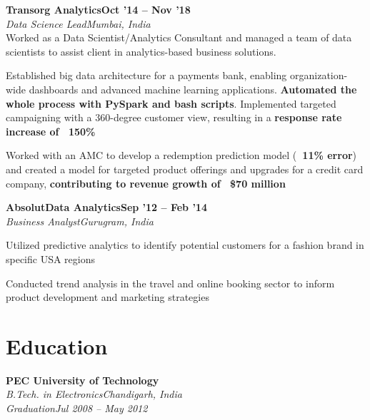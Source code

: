 \documentclass[letterpaper,10pt]{article}
\newcommand{\heading}[2]{
  \hspace{10pt}#1\hfill#2\\
}
\newcommand{\headingBf}[2]{
  \heading{\textbf{#1}}{\textbf{#2}}
}
\newcommand{\headingIt}[2]{
  \heading{\textit{#1}}{\textit{#2}}
}
\newenvironment{resume_list}{
  \vspace{-7pt}
  \begin{itemize}[itemsep=-2px, parsep=1pt, leftmargin=30pt]
}{
  \end{itemize}
}
\begin{document}
  \headingBf{Transorg Analytics}{Oct '14 -- Nov '18}
  \headingIt{Data Science Lead}{Mumbai, India}
  Worked as a Data Scientist/Analytics Consultant and managed a team of data scientists to assist client in analytics-based business solutions.
  \begin{resume_list}
    \item Established big data architecture for a payments bank, enabling organization-wide dashboards and advanced machine learning applications. \textbf{Automated the whole process with PySpark and bash scripts}. Implemented targeted campaigning with a 360-degree customer view, resulting in a \textbf{response rate increase of ~150\%}
    \item Worked with an AMC to develop a redemption prediction model (\textbf{~11\% error}) and created a model for targeted product offerings and upgrades for a credit card company, \textbf{contributing to revenue growth of ~\$70 million}
  \end{resume_list}

  \headingBf{AbsolutData Analytics}{Sep '12 -- Feb '14}
  \headingIt{Business Analyst}{Gurugram, India}
  \begin{resume_list}
    \item Utilized predictive analytics to identify potential customers for a fashion brand in specific USA regions
    \item Conducted trend analysis in the travel and online booking sector to inform product development and marketing strategies
  \end{resume_list}


  \section{Education}

  \headingBf{PEC University of Technology}{}
  \headingIt{B.Tech. in Electronics}{Chandigarh, India}
  \headingIt{Graduation}{Jul 2008 – May 2012}
\end{document}

